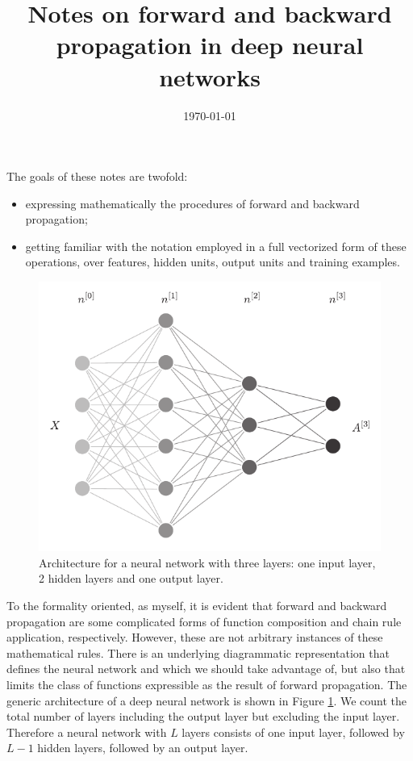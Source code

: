 \documentclass[aps,10pt]{revtex4}
\theoremstyle{plain}
\theoremstyle{definition}
\theoremstyle{remark}
\begin{document}
\title{Notes on forward and backward propagation in deep neural networks}
\date{\today}
\maketitle

\vspace{2cm}

\noindent The goals of these notes are twofold:
\begin{itemize}
	\item expressing mathematically the procedures of forward and backward propagation;
	\item getting familiar with the notation employed in a full vectorized form of these operations, over features, hidden units, output units and training examples.
\end{itemize}

\begin{figure}
	\centering
	\includegraphics[width=0.8\linewidth]{nn_diagram}
	\caption{Architecture for a neural network with three layers: one input layer, 2 hidden layers and one output layer.}
	\label{fig:nndiagram}
\end{figure}
To the formality oriented, as myself, it is evident that forward and backward propagation are some complicated forms of function composition and chain rule application, respectively. However, these are not arbitrary instances of these mathematical rules. There is an underlying diagrammatic representation that defines the neural network and which we should take advantage of, but also that limits the class of functions expressible as the result of forward propagation. The generic architecture of a deep neural network is shown in Figure \ref{fig:nndiagram}. We count the total number of layers including the output layer but excluding the input layer. Therefore a neural network with $L$ layers consists of one input layer, followed by $L-1$ hidden layers, followed by an output layer.
\end{document}
